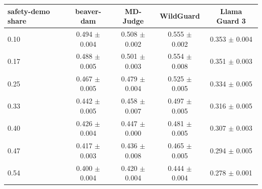 \begin{tabular}{lcccc}
\toprule
safety-demo share & beaver-dam & MD-Judge & WildGuard & Llama Guard 3 \\
\midrule
0.10 & 0.494 $\pm$ 0.004 & 0.508 $\pm$ 0.002 & 0.555 $\pm$ 0.002 & 0.353 $\pm$ 0.004 \\
0.17 & 0.488 $\pm$ 0.005 & 0.501 $\pm$ 0.003 & 0.554 $\pm$ 0.008 & 0.351 $\pm$ 0.003 \\
0.25 & 0.467 $\pm$ 0.005 & 0.479 $\pm$ 0.004 & 0.525 $\pm$ 0.005 & 0.334 $\pm$ 0.005 \\
0.33 & 0.442 $\pm$ 0.005 & 0.458 $\pm$ 0.007 & 0.497 $\pm$ 0.005 & 0.316 $\pm$ 0.005 \\
0.40 & 0.426 $\pm$ 0.004 & 0.447 $\pm$ 0.000 & 0.481 $\pm$ 0.005 & 0.307 $\pm$ 0.003 \\
0.47 & 0.417 $\pm$ 0.003 & 0.436 $\pm$ 0.008 & 0.465 $\pm$ 0.005 & 0.294 $\pm$ 0.005 \\
0.54 & 0.400 $\pm$ 0.004 & 0.420 $\pm$ 0.004 & 0.444 $\pm$ 0.004 & 0.278 $\pm$ 0.001 \\
\bottomrule
\end{tabular}
